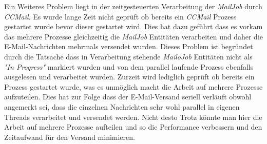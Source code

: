 \newline
\newline
Ein Weiteres Problem liegt in der zeitgesteuerten Verarbeitung der \emph{MailJob} durch \emph{CCMail}. Es wurde lange Zeit nicht geprüft ob bereits ein \emph{CCMail} Prozess gestartet wurde bevor dieser gestartet wird. Dies hat dazu geführt dass es vorkam das mehrere Prozesse gleichzeitig die \emph{MailJob} Entitäten verarbeiten und daher die E-Mail-Nachrichten mehrmals versendet wurden. Dieses Problem ist begründet durch die Tatsache dass in Verarbeitung stehende \emph{MailoJob} Entitäten nicht als \emph{"In Progress"} markiert wurden und von dem parallel laufende Prozess ebenfalls ausgelesen und verarbeitet wurden. Zurzeit wird lediglich geprüft ob bereits ein Prozess gestartet wurde, was es unmöglich macht die Arbeit auf mehrere Prozesse aufzuteilen. Dies hat zur Folge dass der E-Mail-Versand seriell verläuft obwohl angemerkt sei, dass die einzelnen Nachrichten sehr wohl parallel in eigenen Threads verarbeitet und versendet werden. Nicht desto Trotz könnte man hier die Arbeit auf mehrere Prozesse aufteilen und so die Performance verbessern und den Zeitaufwand für den Versand minimieren.

\newpage
